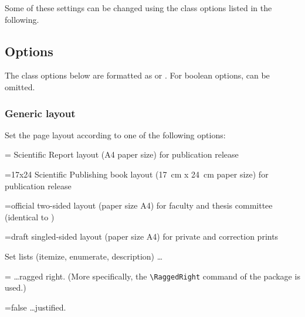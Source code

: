 Some of these settings can be changed using the class options listed in the following.

\subsection{Options}
\label{sec:options}

The class options below are formatted as  or . For boolean options,  can be omitted.

\subsubsection{Generic layout}
\label{sec:generic-layout}

\begin{optionlist}
   \opt[layout] Set the  page layout according to one of the following options:
   \begin{valuelist}
      \item[=\optionvaluedefaultfont{report}] \KIT Scientific Report layout (A4 paper size) for publication release
      \item[=17x24] \KIT Scientific Publishing book layout (\SI{17}{\centi\meter} x \SI{24}{\centi\meter} paper size) for publication release
      \item[=official] two-sided layout (paper size A4) for faculty and thesis committee (identical to )
      \item[=draft] singled-sided layout (paper size A4) for private and correction prints
   \end{valuelist}
   
   \opt[raggedlists] Set lists (itemize, enumerate, description) \dots
   \begin{valuelist}
      \item[=\optionvaluedefaultfont{true}] \dots ragged right. (More specifically, the \lstinline|\RaggedRight| command of the  package is used.)
      \item[=false] \dots justified.
   \end{valuelist}
\end{optionlist}

